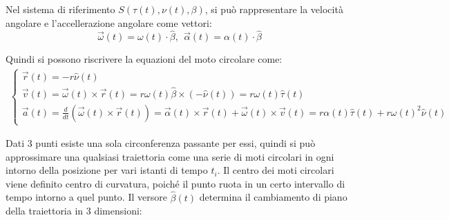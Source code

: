 \documentclass{article}
\numberwithin{equation}{subsection}
\begin{document}
\begin{center}\end{center}

Nel sistema di riferimento $S(\tau(t),\nu(t),\beta)$, 
si può rappresentare 
la velocità angolare e l'accellerazione angolare come vettori:
\begin{equation}
    \vec{\omega}(t)=\omega(t)\cdot\hat{\beta}{,}\:\: \vec{\alpha}(t)=\alpha(t)\cdot\hat{\beta}
\end{equation}

Quindi si possono riscrivere la equazioni del moto circolare come:
\begin{gather}
    \begin{cases}
        \vec{r}(t)=-r\hat{\nu}(t)\\
        \vec{v}(t)=\vec{\omega}(t)\times\vec{r}(t)=r\omega(t)\hat{\beta}\times(-\hat{\nu}(t))=r\omega(t)\hat{\tau}(t)\\
        \vec{a}(t)=\displaystyle\frac{d}{dt}(\vec{\omega}(t)\times\vec{r}(t))=
        \vec{\alpha}(t)\times\vec{r}(t)+\vec{\omega}(t)\times\vec{v}(t)=
        r\alpha(t)\hat{\tau}(t)+r\omega(t)^{2}\hat{\nu}(t)
    \end{cases}
\end{gather}

Dati 3 punti esiste una sola circonferenza passante per essi, 
quindi si può approssimare una qualsiasi traiettoria come una serie 
di moti circolari in ogni intorno della posizione per vari istanti di tempo $t_i$. Il centro dei moti circolari viene definito centro di curvatura, 
poiché il punto ruota in un certo intervallo di tempo intorno a quel punto. 
Il versore $\hat{\beta}(t)$ determina il cambiamento di piano della 
traiettoria in 3 dimensioni:
\end{document}
